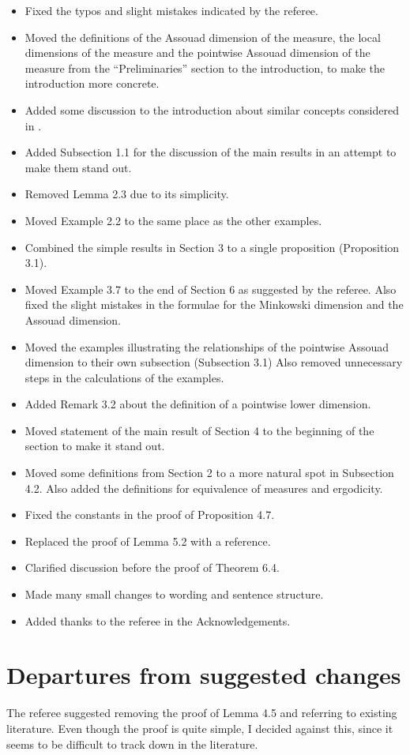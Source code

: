 \documentclass[12pt]{amsart}
\numberwithin{equation}{section}
\theoremstyle{plain}
\theoremstyle{definition}
\theoremstyle{remark}
\begin{document}
\begin{itemize}
    \item Fixed the typos and slight mistakes indicated by the referee.
    \item Moved the definitions of the Assouad dimension of the measure, the local dimensions of the measure and the pointwise Assouad dimension of the measure from the ``Preliminaries'' section to the introduction, to make the introduction more concrete.
    \item Added some discussion to the introduction about similar concepts considered in \cite{BBL}.
    \item Added Subsection 1.1 for the discussion of the main results in an attempt to make them stand out.
    \item Removed Lemma 2.3 due to its simplicity.
    \item Moved Example 2.2 to the same place as the other examples.
    \item Combined the simple results in Section 3 to a single proposition (Proposition 3.1).
    \item Moved Example 3.7 to the end of Section 6 as suggested by the referee. Also fixed the slight mistakes in the formulae for the Minkowski dimension and the Assouad dimension.
    \item Moved the examples illustrating the relationships of the pointwise Assouad dimension to their own subsection (Subsection 3.1) Also removed unnecessary steps in the calculations of the examples.
    \item Added Remark 3.2 about the definition of a pointwise lower dimension.
    \item Moved statement of the main result of Section 4 to the beginning of the section to make it stand out.
    \item Moved some definitions from Section 2 to a more natural spot in Subsection 4.2. Also added the definitions for equivalence of measures and ergodicity.
    \item Fixed the constants in the proof of Proposition 4.7.
    \item Replaced the proof of Lemma 5.2 with a reference.
    \item Clarified discussion before the proof of Theorem 6.4.
    \item Made many small changes to wording and sentence structure.
    \item Added thanks to the referee in the Acknowledgements.
\end{itemize}
\section*{Departures from suggested changes}
The referee suggested removing the proof of Lemma 4.5 and referring to existing literature. Even though the proof is quite simple, I decided against this, since it seems to be difficult to track down in the literature.



\end{document}
